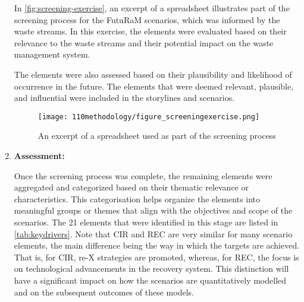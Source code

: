 \begin{enumerate}
        In \autoref{fig:screening-exercise}, an excerpt of a spreadsheet illustrates part of the screening process for the FutuRaM scenarios, which was informed by the waste streams. In this exercise, the elements were evaluated based on their relevance to the waste streams and their potential impact on the waste management system.
        
        The elements were also assessed based on their plausibility and likelihood of occurrence in the future. The elements that were deemed relevant, plausible, and influential were included in the storylines and scenarios.

        \begin{landscape}
          \begin{figure}[h]
            \centering
            \texttt{[image: 110methodology/figure\_screeningexercise.png]}
            \caption{An excerpt of a spreadsheet used as part of the screening process}\label{fig:screening-exercise}
          \end{figure}
        \end{landscape}



  \item \textbf{Assessment:}

        Once the screening process was complete, the remaining elements were aggregated and categorized based on their thematic relevance or characteristics. This categorisation helps organize the elements into meaningful groups or themes that align with the objectives and scope of the scenarios.
        \vspace{\baselineskip}
        The 21 elements that were identified in this stage are listed in \autoref{tab:keydrivers}. Note that CIR and REC are very similar for many scenario elements, the main difference being the way in which the targets are achieved. That is, for CIR, re-X strategies are promoted, whereas, for REC, the focus is on technological advancements in the recovery system. This distinction will have a significant impact on how the scenarios are quantitatively modelled and on the subsequent outcomes of these models.


\end{enumerate}
